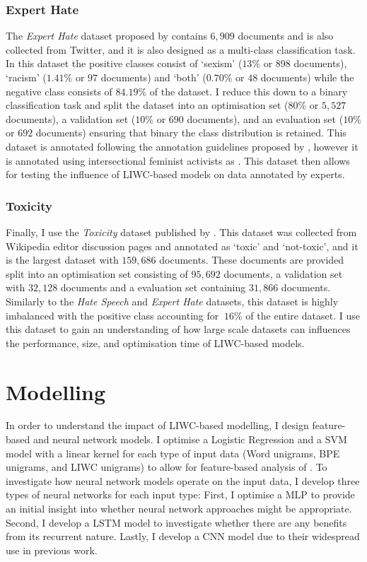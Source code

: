 \subsubsection{Expert Hate}
The \textit{Expert Hate} dataset proposed by \citet{Waseem:2016} contains $6,909$ documents and is also collected from Twitter, and it is also designed as a multi-class classification task.
In this dataset the positive classes consist of `sexism' ($13\%$ or $898$ documents), `racism' ($1.41\%$ or $97$ documents) and `both' ($0.70\%$ or $48$ documents) while the negative class consists of $84.19\%$ of the dataset.
I reduce this down to a binary classification task and split the dataset into an optimisation set ($80\%$ or $5,527$ documents), a validation set ($10\%$ or $690$ documents), and an evaluation set ($10\%$ or $692$ documents) ensuring that binary the class distribution is retained.
This dataset is annotated following the annotation guidelines proposed by \citet{Waseem-Hovy:2016}, however it is annotated using intersectional feminist activists as .
This dataset then allows for testing the influence of LIWC-based models on data annotated by experts.

\subsubsection{Toxicity}
Finally, I use the \textit{Toxicity} dataset published by \citet{Wulczyn:2017}.
This dataset was collected from Wikipedia editor discussion pages and annotated as `toxic' and `not-toxic', and it is the largest dataset with $159,686$ documents.
These documents are provided split into an optimisation set consisting of $95,692$ documents, a validation set with $32,128$ documents and a evaluation set containing $31,866$ documents.
Similarly to the \textit{Hate Speech} and \textit{Expert Hate} datasets, this dataset is highly imbalanced with the positive class accounting for $~16\%$ of the entire dataset.
I use this dataset to gain an understanding of how large scale datasets can influences the performance, size, and optimisation time of LIWC-based models.

\section{Modelling}\label{sec:LIWC_modelling}
In order to understand the impact of LIWC-based modelling, I design feature-based and neural network models.
I optimise a Logistic Regression  and a SVM model with a linear kernel for each type of input data (Word unigrams, BPE unigrams, and LIWC unigrams) to allow for feature-based analysis of .
To investigate how neural network models operate on the input data, I develop three types of neural networks for each input type: 
First, I optimise a MLP to provide an initial insight into whether neural network approaches might be appropriate. 
Second, I develop a LSTM model to investigate whether there are any benefits from its recurrent nature.
Lastly, I develop a CNN model due to their widespread use in previous work.

